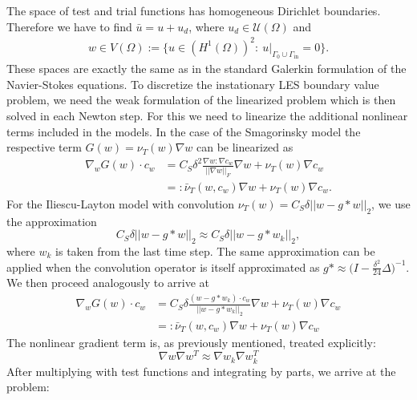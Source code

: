 \documentclass[a4paper, 11pt, twoside]{article}
\begin{document}
The space of test and trial functions has homogeneous Dirichlet boundaries. 
Therefore we have to find $\bar{u}= u+u_d$, where $u_d \in \mathcal{U}(\Omega)$ and
\begin{align*}
w\in   V(\Omega) := \{ u\in (H^1(\Omega))^2 : \
u|_{\Gamma_0 \cup \Gamma_{\text{in}}}= 0\}.
\end{align*} 
These spaces are exactly the same as in the standard Galerkin formulation of the Navier-Stokes equations. To discretize the instationary LES boundary value problem, we need the weak formulation of the linearized problem which is then solved in each Newton step. For this we need to linearize the additional nonlinear terms included in the models. In the case of the Smagorinsky model the respective term $G(w) = \nu_T(w)\nabla w$ can be linearized as \begin{equation}
\begin{aligned}
  \nabla_{w} G(w) \cdot c_w &= C_S \delta^2\frac{\nabla w : \nabla c_w}{||\nabla w||_F} \nabla w + \nu_T(w)\nabla c_w \\  &=: \bar{\nu}_T(w,c_w)\nabla w + \nu_T(w)\nabla c_w.    
\end{aligned}
\end{equation} For the Iliescu-Layton model with convolution $\nu_T(w) = C_S\delta ||w - g * w||_2$, we use the approximation \begin{equation}
\label{ilappr}
    C_S\delta ||w - g * w||_2 \approx C_S\delta ||w - g * w_k||_2, 
\end{equation} where $w_k$ is taken from the last time step. The same approximation can be applied when the convolution operator is itself approximated as $g* \approx \big(I-\frac{\delta^2}{24}\Delta\big)^{-1}$. We then proceed analogously to arrive at \begin{equation}
\begin{aligned}
  \nabla_{w} G(w) \cdot c_w &= C_S\delta \frac{(w-g * w_k) \cdot c_w}{||w-g * w_k||_2} \nabla w + \nu_T(w) \nabla c_w \\&=: \bar{\nu}_T(w,c_w)\nabla w + \nu_T(w)\nabla c_w
\end{aligned}
\end{equation}
The nonlinear gradient term is, as previously mentioned, treated explicitly: \begin{equation}
    \nabla w \nabla w^T \approx \nabla w_k \nabla w_k^T
\end{equation} After multiplying with test functions and integrating by parts, we arrive at the problem: 
\end{document}
